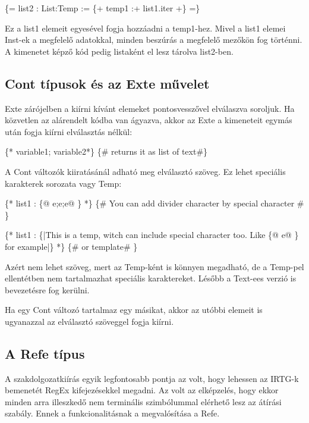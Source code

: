 {\{= list2 : List:Temp := \{+ temp1 :+ list1.iter +\} =\}

Ez a list1 elemeit egyesével fogja hozzáadni a temp1-hez.
Mivel a list1 elemei Inst-ek a megfelelő adatokkal, minden beszúrás a megfelelő mezőkön fog történni.
A kimenetet képző kód pedig listaként el lesz tárolva list2-ben.

\subsection{Cont típusok és az Exte művelet}
\label{sec:SContExte}
Exte zárójelben a kiírni kívánt elemeket pontosvesszővel elválaszva soroljuk.
Ha közvetlen az alárendelt kódba van ágyazva, akkor az Exte a kimeneteit egymás után fogja kiírni elválasztás nélkül:

\{* variable1; variable2*\} \{\# returns it as list of text\#\}

A Cont változók kiiratásánál adható meg elválasztó szöveg.
Ez lehet speciális karakterek sorozata vagy Temp:

\{* list1 : \{@ e;e;e@ \} *\} \{\# You can add divider character by special character \#  \}

\{* list1 : \{|This is a temp, witch can include special character too. Like \{@ e@ \} for example|\} *\} \{\# or template\# \}

Azért nem lehet szöveg, mert az Temp-ként is könnyen megadható, de a Temp-pel ellentétben nem tartalmazhat speciális karaktereket.
Lésőbb a Text-ees verzió is bevezetésre fog kerülni.

Ha egy Cont változó tartalmaz egy másikat, akkor az utóbbi elemeit is ugyanazzal az elválasztó szöveggel fogja kiírni. 

\subsection{A Refe típus}
\label{sec:SRefe}

A szakdolgozatkiírás egyik legfontosabb pontja az volt, hogy lehessen az IRTG-k bemenetét RegEx kifejezésekkel megadni.
Az volt az elképzelés, hogy ekkor minden arra illeszkedő nem terminális szimbólummal elérhető lesz az átírási szabály.
Ennek a funkcionalitásnak a megvalósítása a Refe.

}
